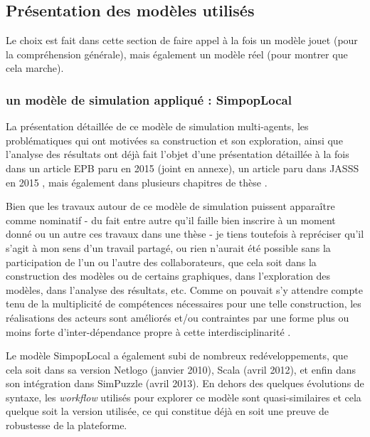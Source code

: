 
\subsection{Présentation des modèles utilisés}

Le choix est fait dans cette section de faire appel à la fois un modèle jouet (pour la compréhension générale), mais également un modèle réel (pour montrer que cela marche).

\subsubsection{un modèle de simulation appliqué : SimpopLocal}

La présentation détaillée de ce modèle de simulation multi-agents, les problématiques qui ont motivées sa construction et son exploration, ainsi que l'analyse des résultats ont déjà fait l'objet d'une présentation détaillée à la fois dans un article EPB paru en 2015 \autocite{Schmitt2015} (joint en annexe), un article paru dans JASSS en 2015 \autocite{Reuillon2015}, mais également dans plusieurs chapitres de thèse \autocite{Schmitt2014}.

Bien que les travaux autour de ce modèle de simulation puissent apparaître comme nominatif - du fait entre autre qu'il faille bien inscrire à un moment donné ou un autre ces travaux dans une thèse - je tiens toutefois à repréciser qu'il s'agit à mon sens d'un travail partagé, ou rien n'aurait été possible sans la participation de l'un ou l'autre des collaborateurs, que cela soit dans la construction des modèles ou de certains graphiques, dans l'exploration des modèles, dans l'analyse des résultats, etc. Comme on pouvait s'y attendre compte tenu de la multiplicité de compétences nécessaires pour une telle construction, les réalisations des acteurs sont améliorés et/ou contraintes par une forme plus ou moins forte d'inter-dépendance propre à cette interdisciplinarité \autocite{Chapron2014}.

Le modèle SimpopLocal a également subi de nombreux redéveloppements, que cela soit dans sa version Netlogo (janvier 2010), Scala (avril 2012), et enfin dans son intégration dans SimPuzzle (avril 2013). En dehors des quelques évolutions de syntaxe, les \textit{workflow} utilisés pour explorer ce modèle sont quasi-similaires et cela quelque soit la version utilisée, ce qui constitue déjà en soit une preuve de robustesse de la plateforme.

